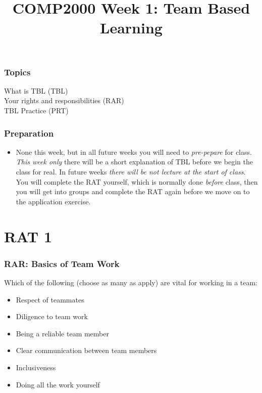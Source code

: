 \documentclass[twoside=false,DIV=14]{scrartcl}
\title{\color{redish} \vspace{-1em}COMP2000 Week 1: Team Based Learning}
\begin{document}
{\color{blackish}\maketitle}\vspace{-7em}

\begin{abstract}
\end{abstract}

\section*{Topics}
\begin{description}
\item[What is TBL (TBL)]  
\item[Your rights and responsibilities (RAR)]  
\item[TBL Practice (PRT)]
\end{description}
\section*{Preparation}
\begin{itemize}
\item None this week, but in all future weeks you will need to \emph{pre-pepare} for class.  \emph{This week only} there will be a short explanation of TBL before we begin the class for real.  In future weeks \emph{there will be not lecture at the start of class}.  You will complete the RAT yourself, which is normally done \emph{before} class, then you will get into groups and complete the RAT again before we move on to the application exercise.
\end{itemize}


\newpage
\part*{RAT 1}
\section*{RAR: Basics of Team Work}
Which of the following (choose as many as apply) are vital for working in a team:
\begin{itemize}
    \item Respect of teammates
    \item Diligence to team work
    \item Being a reliable team member
    \item Clear communication between team members
    \item Inclusiveness
    \item Doing all the work yourself
\end{itemize}
\end{document}
